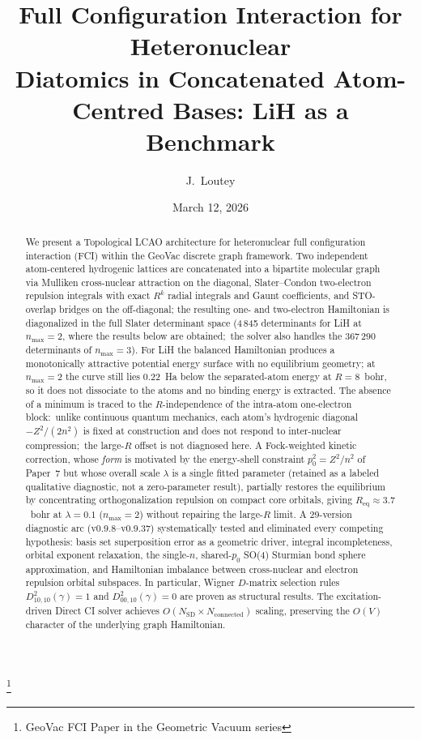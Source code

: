 \documentclass[aps,pra,twocolumn,superscriptaddress,longbibliography]{revtex4-2}
\begin{document}
\title{Full Configuration Interaction for Heteronuclear\\
Diatomics in Concatenated Atom-Centred Bases: LiH as a Benchmark}
\thanks{GeoVac FCI Paper in the Geometric Vacuum series}

\author{J.~Loutey}

\date{March 12, 2026}


\begin{abstract}
We present a Topological LCAO architecture for heteronuclear full
configuration interaction (FCI) within the GeoVac discrete graph
framework.  Two independent atom-centered hydrogenic lattices are
concatenated into a bipartite molecular graph via Mulliken cross-nuclear
attraction on the diagonal, Slater--Condon two-electron repulsion
integrals with exact $R^k$ radial integrals and Gaunt coefficients, and
STO-overlap bridges on the off-diagonal; the resulting one- and
two-electron Hamiltonian is diagonalized in the full Slater determinant
space (4\,845 determinants for LiH at $n_{\max}=2$, where the results
below are obtained;\ the solver also handles the 367\,290 determinants of
$n_{\max}=3$).  For LiH the
balanced Hamiltonian produces a monotonically attractive potential
energy surface with no equilibrium geometry; at $n_{\max}=2$ the curve
still lies 0.22~Ha below the separated-atom energy at $R=8$~bohr, so it
does not dissociate to the atoms and no binding energy is extracted.
The absence of a minimum is traced to the $R$-independence of the intra-atom
one-electron block:\ unlike continuous quantum mechanics, each atom's
hydrogenic diagonal $-Z^2/(2n^2)$ is fixed at construction and does not
respond to inter-nuclear compression;\ the large-$R$ offset is not
diagnosed here.  A Fock-weighted kinetic correction, whose
\emph{form} is motivated by the energy-shell constraint $p_0^2 = Z^2/n^2$
of Paper~7 but whose overall scale $\lambda$ is a single fitted parameter
(retained as a labeled qualitative diagnostic, not a zero-parameter
result), partially restores the equilibrium by concentrating
orthogonalization repulsion on compact core orbitals, giving
$R_{\mathrm{eq}}\approx 3.7$~bohr at $\lambda=0.1$ ($n_{\max}=2$)
without repairing the large-$R$ limit.  A 29-version diagnostic arc
(v0.9.8--v0.9.37) systematically tested and eliminated every competing
hypothesis: basis set superposition error as a geometric driver, integral
incompleteness, orbital exponent relaxation, the single-$n$, shared-$p_0$
SO(4) Sturmian bond sphere approximation, and Hamiltonian imbalance between cross-nuclear and
electron repulsion orbital subspaces.  In particular, Wigner $D$-matrix
selection rules $D^{2}_{10,10}(\gamma)=1$ and
$D^{2}_{00,10}(\gamma)=0$ are proven as structural results.  The
excitation-driven Direct CI solver achieves
$O(N_{\mathrm{SD}}\times N_{\mathrm{connected}})$ scaling, preserving the
$O(V)$ character of the underlying graph Hamiltonian.
\end{abstract}
\end{document}
